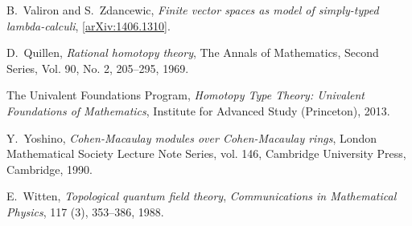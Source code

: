 \documentclass[english,letter paper,12pt,reqno]{article}
\theoremstyle{example}
\numberwithin{equation}{section}
\begin{document}
\begin{thebibliography}{BHLS03}
B.~Valiron and S.~Zdancewic, \textsl{Finite vector spaces as model of simply-typed lambda-calculi}, \href{http://arxiv.org/abs/1406.1310v1}{[arXiv:1406.1310]}.

D.~Quillen, \textsl{Rational homotopy theory}, The Annals of Mathematics, Second Series, Vol. 90, No. 2, 205--295, 1969.

The Univalent Foundations Program, \textsl{Homotopy {T}ype {T}heory: {U}nivalent {F}oundations of {M}athematics}, Institute for Advanced Study (Princeton), 2013.

Y.~Yoshino, \emph{Cohen-{M}acaulay modules over {C}ohen-{M}acaulay rings},
  London Mathematical Society Lecture Note Series, vol. 146, Cambridge
  University Press, Cambridge, 1990. 
  
E.~Witten, \textsl{Topological quantum field theory}, \textsl{Communications in Mathematical Physics}, 117 (3), 353--386, 1988.

\end{thebibliography}
\end{document}
